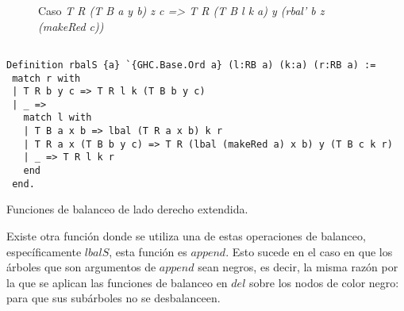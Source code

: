 \begin{figure}[!ht]
\centering
\captionsetup{justification=centering}
\caption{Caso \textit{T R (T B a y b) z c => T R (T B l k a) y (rbal' b z (makeRed c))}}
\label{balanceo_grafico_del_3}
\end{figure}

\begin{listing}[!ht]
\centering
\captionsetup{justification=centering}
\begin{verbatim}

Definition rbalS {a} `{GHC.Base.Ord a} (l:RB a) (k:a) (r:RB a) :=
 match r with
 | T R b y c => T R l k (T B b y c)
 | _ =>
   match l with
   | T B a x b => lbal (T R a x b) k r
   | T R a x (T B b y c) => T R (lbal (makeRed a) x b) y (T B c k r)
   | _ => T R l k r
   end
 end.

\end{verbatim}
\caption{Funciones de balanceo de lado derecho extendida.}
\label{rbalS}
\end{listing}

Existe otra función donde se utiliza una de estas operaciones de balanceo, específicamente 
\hyperref[lbalS]{$lbalS$}, esta funci\'on es \hyperref[func_app]{$append$}. Esto sucede en el caso 
en que los \'arboles que son argumentos de \hyperref[func_app]{$append$} sean negros, es decir, la 
misma razón por la que se aplican las funciones de balanceo en \hyperref[func_del]{$del$} sobre los 
nodos de color negro: para que sus subárboles no se desbalanceen.

